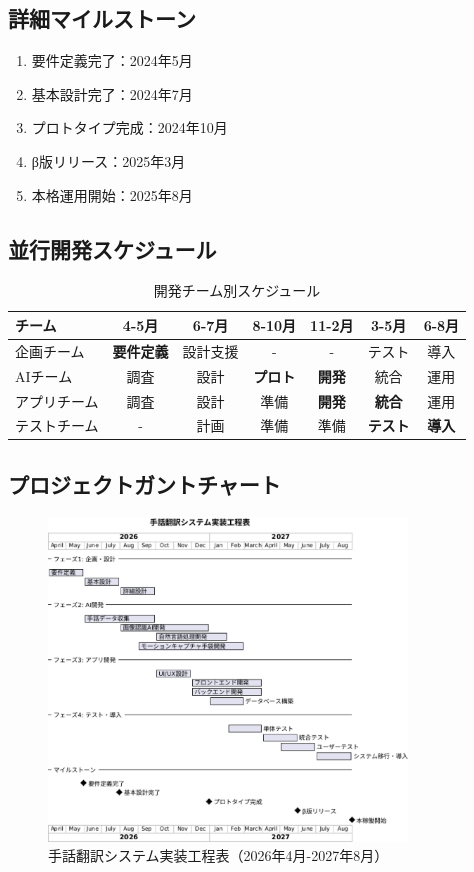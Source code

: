 \documentclass[12pt,a4paper]{jsarticle}
\begin{document}
\subsection{詳細マイルストーン}
\begin{enumerate}
    \item 要件定義完了：2024年5月
    \item 基本設計完了：2024年7月
    \item プロトタイプ完成：2024年10月
    \item β版リリース：2025年3月
    \item 本格運用開始：2025年8月
\end{enumerate}

\subsection{並行開発スケジュール}
\begin{table}[h]
\centering
\caption{開発チーム別スケジュール}
\begin{tabular}{|l|c|c|c|c|c|c|}
\hline
\textbf{チーム} & \textbf{4-5月} & \textbf{6-7月} & \textbf{8-10月} & \textbf{11-2月} & \textbf{3-5月} & \textbf{6-8月} \\
\hline
企画チーム & \textbf{要件定義} & 設計支援 & - & - & テスト & 導入 \\
\hline
AIチーム & 調査 & 設計 & \textbf{プロト} & \textbf{開発} & 統合 & 運用 \\
\hline
アプリチーム & 調査 & 設計 & 準備 & \textbf{開発} & \textbf{統合} & 運用 \\
\hline
テストチーム & - & 計画 & 準備 & 準備 & \textbf{テスト} & \textbf{導入} \\
\hline
\end{tabular}
\end{table}


\subsection{プロジェクトガントチャート}
\begin{figure}[H]
\centering
\includegraphics[width=0.85\textwidth]{gantchart.eps}
\caption{手話翻訳システム実装工程表（2026年4月-2027年8月）}
\label{fig:gantchart}
\end{figure}
\end{document}
